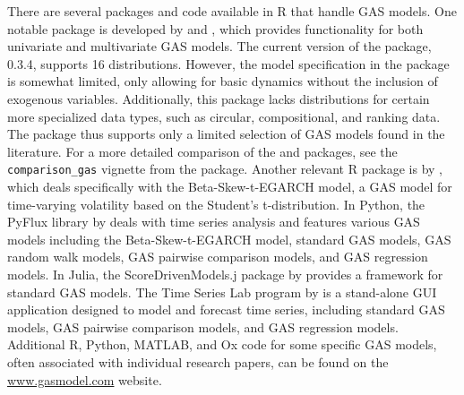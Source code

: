 There are several packages and code available in R that handle GAS models. One notable package is  developed by \citet{Ardia2018} and \citet{Ardia2019}, which provides functionality for both univariate and multivariate GAS models. The current version of the  package, 0.3.4, supports 16 distributions. However, the model specification in the  package is somewhat limited, only allowing for basic dynamics without the inclusion of exogenous variables. Additionally, this package lacks distributions for certain more specialized data types, such as circular, compositional, and ranking data. The package thus supports only a limited selection of GAS models found in the literature. For a more detailed comparison of the  and  packages, see the \texttt{comparison\_gas} vignette from the  package. Another relevant R package is  by \citet{Sucarrat2013}, which deals specifically with the Beta-Skew-t-EGARCH model, a GAS model for time-varying volatility based on the Student's t-distribution. In Python, the PyFlux library by \citet{Taylor2017} deals with time series analysis and features various GAS models including the Beta-Skew-t-EGARCH model, standard GAS models, GAS random walk models, GAS pairwise comparison models, and GAS regression models. In Julia, the ScoreDrivenModels.j package by \citet{Bodin2020} provides a framework for standard GAS models. The Time Series Lab program by \citet{Lit2021} is a stand-alone GUI application designed to model and forecast time series, including standard GAS models, GAS pairwise comparison models, and GAS regression models. Additional R, Python, MATLAB, and Ox code for some specific GAS models, often associated with individual research papers, can be found on the \url{www.gasmodel.com} website.


